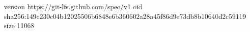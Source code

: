 version https://git-lfs.github.com/spec/v1
oid sha256:149c230c04b12025506b6848e6b360602a28a45f86d9e73db8b10640d2c59119
size 11068
